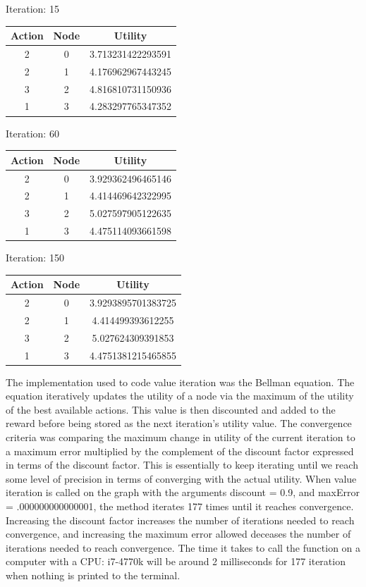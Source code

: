 \documentclass[11pt, oneside]{article}   	%
\begin{document}
\begin{flushleft}
Iteration: 15
\begin{center}
\begin{tabular}{|c|c|c|}
\hline
Action & Node &	Utility \\ \hline
2 & 0 &	3.713231422293591 \\ \hline
2 & 1 &	4.176962967443245 \\ \hline
3 & 2 &	4.816810731150936 \\ \hline
1 & 3 &	4.283297765347352 \\ \hline
\end{tabular}
\end{center}

Iteration: 60
\begin{center}
\begin{tabular}{|c|c|c|}
\hline
Action & Node &	Utility \\ \hline
2 & 0 &	3.929362496465146 \\ \hline
2 & 1 &	4.414469642322995 \\ \hline
3 & 2 &	5.027597905122635 \\ \hline
1 & 3 &	4.475114093661598 \\ \hline
\end{tabular}
\end{center}

Iteration: 150
\begin{center}
\begin{tabular}{|c|c|c|}
\hline
Action & Node &	Utility \\ \hline
2 & 0 &	3.9293895701383725 \\ \hline
2 & 1 &	4.414499393612255 \\ \hline
3 & 2 &	5.027624309391853 \\ \hline
1 & 3 &	4.4751381215465855 \\ \hline
\end{tabular}
\end{center}

The implementation used to code value iteration was the Bellman equation. The equation iteratively updates the utility of a node via the maximum of the utility of the best available actions. This value is then discounted and added to the reward before being stored as the next iteration's utility value. The convergence criteria was comparing the maximum change in utility of the current iteration to a maximum error multiplied by the complement of the discount factor expressed in terms of the discount factor. This is essentially to keep iterating until we reach some level of precision in terms of converging with the actual utility. When value iteration is called on the graph with the arguments discount = 0.9, and maxError = .000000000000001, the method iterates 177 times until it reaches convergence. Increasing the discount factor increases the number of iterations needed to reach convergence, and increasing the maximum error allowed deceases the number of iterations needed to reach convergence. The time it takes to call the function on a computer with a CPU: i7-4770k will be around 2 milliseconds for 177 iteration when nothing is printed to the terminal.


\end{flushleft}
\end{document}
